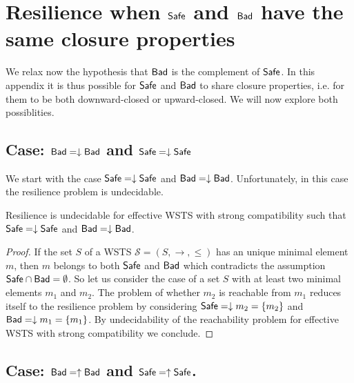 

\section{Resilience when $\textsf{Safe}$ and $\textsf{Bad}$ have the same closure properties}

We relax now the hypothesis that $\textsf{Bad}$ is the complement of $\textsf{Safe}$. In this appendix it is thus possible for $\textsf{Safe}$ and $\textsf{Bad}$ to share closure properties, i.e. for them to be both downward-closed or upward-closed. We will now explore both possiblities.


\subsection{Case: $\textsf{Bad}=\downarrow \textsf{Bad}$ and $\textsf{Safe}=\downarrow \textsf{Safe}$}\label{case down down}

We start with the case $\textsf{Safe} = \downarrow \textsf{Safe}$ and $\textsf{Bad} = \downarrow \textsf{Bad}$.
%
Unfortunately, in this case the resilience problem is undecidable.

\begin{theorem}\label{down-down}
{\sc Resilience} is undecidable for  effective WSTS with  strong  compatibility such that
$\textsf{Safe}=\downarrow \textsf{Safe}$
and $\textsf{Bad}=\downarrow \textsf{Bad}$.
\end{theorem}

\begin{proof}
If the set $S$ of a WSTS $\mathscr{S}=(S,\rightarrow, \leq)$ has an unique minimal element $m$, then $m$ belongs to both $\textsf{Safe}$ and $\textsf{Bad}$ which contradicts the assumption $\textsf{Safe} \cap \textsf{Bad}= \emptyset$. So let us consider the case of a set $S$ with at least two minimal elements $m_1$ and $m_2$.
The problem of whether $m_2$ is reachable from $m_1$ reduces itself to the resilience problem by considering $\textsf{Safe}=\downarrow m_2 = \{ m_2\}$ and $\textsf{Bad}=\downarrow m_1 = \{ m_1\}$. By undecidability of the reachability problem for effective WSTS with strong compatibility we conclude.  
\end{proof}


\subsection{Case: $\textsf{Bad}=\uparrow \textsf{Bad}$ and $\textsf{Safe}=\uparrow \textsf{Safe}$.}\label{case up up}



